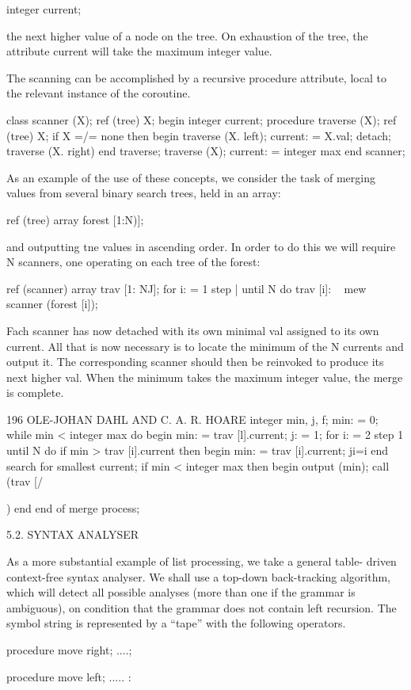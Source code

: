 {{{integer current;

the next higher value of a node on the tree. On exhaustion of the tree, the attribute current will take the maximum integer value.

The scanning can be accomplished by a recursive procedure attribute, local to the relevant instance of the coroutine.

class scanner (X); ref (tree) X; begin integer current; procedure traverse (X); ref (tree) X; if X =/= none then begin traverse (X. left); current: = X.val; detach; traverse (X. right) end traverse; traverse (X); current: = integer max end scanner;

As an example of the use of these concepts, we consider the task of merging values from several binary search trees, held in an array:

ref (tree) array forest [1:N)];

and outputting tne values in ascending order. In order to do this we will require N scanners, one operating on each tree of the forest:

ref (scanner) array trav [1: NJ]; for i: = 1 step | until N do trav [i]: ~ mew scanner (forest [i]);

Fach scanner has now detached with its own minimal val assigned to its own current. All that is now necessary is to locate the minimum of the N currents and output it. The corresponding scanner should then be reinvoked to produce its next higher val. When the minimum takes the maximum integer value, the merge is complete.

196 OLE-JOHAN DAHL AND C. A. R. HOARE integer min, j, f; min: = 0; while min < integer max do begin min: = trav [l].current; j: = 1; for i: = 2 step 1 until N do if min > trav [i].current then begin min: = trav [i].current; ji=i end search for smallest current; if min < integer max then begin output (min); call (trav [/}) end end of merge process;

5.2. SYNTAX ANALYSER

As a more substantial example of list processing, we take a general table- driven context-free syntax analyser. We shall use a top-down back-tracking algorithm, which will detect all possible analyses (more than one if the grammar is ambiguous), on condition that the grammar does not contain left recursion. The symbol string is represented by a “tape” with the following operators.

procedure move right; ....;

procedure move left; ..... :

}}

